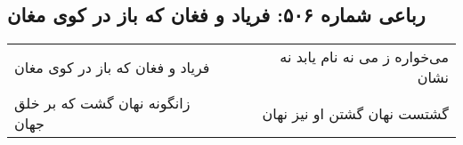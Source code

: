 \begin{center}
\section*{رباعی شماره ۵۰۶: فریاد و فغان که باز در کوی مغان}
\label{sec:sh506}
\begin{longtable}{l p{0.5cm} r}
فریاد و فغان که باز در کوی مغان
&&
می‌خواره ز می نه نام یابد نه نشان
\\
زانگونه نهان گشت که بر خلق جهان
&&
گشتست نهان گشتن او نیز نهان
\\
\end{longtable}
\end{center}
